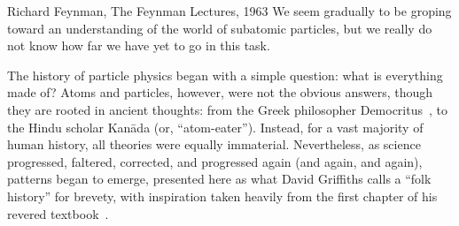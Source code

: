 \begin{dissertationintroduction}
\begin{aquote}{Richard Feynman, The Feynman Lectures, 1963}
    We seem gradually to be groping toward an understanding of the world of subatomic particles, but we really do not know how far we have yet to go in this task.
\end{aquote}
The history of particle physics began with a simple question: what is everything made of? 
Atoms and particles, however, were not the obvious answers, though they are rooted in ancient thoughts: from the Greek philosopher Democritus~\cite{Taylor1419554}, to the Hindu scholar Kan\=ada (or, ``atom-eater''). %
Instead, for a vast majority of human history, all theories were equally immaterial. 
Nevertheless, as science progressed, faltered, corrected, and progressed again (and again, and again), patterns began to emerge, presented here as what David Griffiths calls a ``folk history'' for brevety, with inspiration taken heavily from the first chapter of his revered textbook~\cite{Griffiths}.  


\end{dissertationintroduction}
